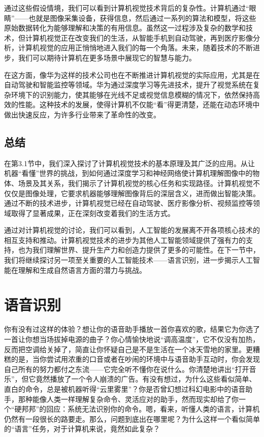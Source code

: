 通过这些假设情境，我们可以看到计算机视觉技术背后的复杂性。计算机通过“眼睛”——也就是图像采集设备，获得信息，然后通过一系列的算法和模型，将这些原始数据转化为能够理解和决策的有用信息。虽然这一过程涉及复杂的数学和技术，但计算机视觉正在改变我们的生活，从智能手机到自动驾驶，再到医疗影像分析，计算机视觉的应用正悄悄地进入我们的每一个角落。未来，随着技术的不断进步，我们可以期待计算机在更多场景中展现它的智慧与能力。

在这方面，像华为这样的技术公司也在不断推进计算机视觉的实际应用，尤其是在自动驾驶和智能监控等领域。华为通过深度学习等先进技术，提升了视觉系统在复杂环境下的识别能力，使其能够在光线不足或视觉信息模糊的情况下，依然保持高效的性能。这种技术的发展，使得计算机不仅能“看”得更清楚，还能在动态环境中做出快速反应，为许多行业带来了革命性的改变。

\subsection{总结}

在第3.1节中，我们深入探讨了计算机视觉技术的基本原理及其广泛的应用。从让机器“看懂”世界的挑战，到如何通过深度学习和神经网络使计算机理解图像中的物体、场景及其关系，我们揭示了计算机视觉的核心任务和实现路径。计算机视觉不仅仅是图像处理，它要求机器能够理解图像背后的深层含义，进而做出智能决策。通过不断的技术进步，计算机视觉已经在自动驾驶、医疗影像分析、视频监控等领域取得了显著成果，正在深刻改变着我们的生活方式。

通过对计算机视觉的讨论，我们可以看到，人工智能的发展离不开各项核心技术的相互支持和推动。计算机视觉技术的进步为其他人工智能领域提供了强有力的支持，也为我们理解世界、提升生产力和创造力提供了更多的可能性。在下一节中，我们将继续探讨另一项至关重要的人工智能技术——语言识别，进一步揭示人工智能在理解和生成自然语言方面的潜力与挑战。


\section{语音识别}


你有没有过这样的体验？想让你的语音助手播放一首你喜欢的歌，结果它为你选了一首让你想当场拔掉电源的曲子？你心情愉快地说“调高温度”，它不仅没有加热，反而把空调给关掉了，简直让你怀疑自己是不是生活在一个冰天雪地的家里。更糟糕的是，当你尝试用浓重的口音或者在吵闹的环境中与语音助手互动时，你会发现自己所有的努力都付之东流——它完全听不懂你在说什么。你清楚地讲出“打开音乐”，但它竟然播放了一个令人崩溃的广告。有没有想过，为什么这些看似简单、直白的命令，总是被机器听得“云里雾里”？你是否曾幻想过科幻电影中的语音助手，那种能像人类一样理解复杂命令、灵活应对的助手，然而现实却给了你一个“硬邦邦”的回应：系统无法识别你的命令。嗯，看来，听懂人类的语言，计算机仍然有一段很长的路要走。那么，问题到底出在哪里呢？为什么这样一个看似简单的“语言”任务，对于计算机来说，竟然如此复杂？

